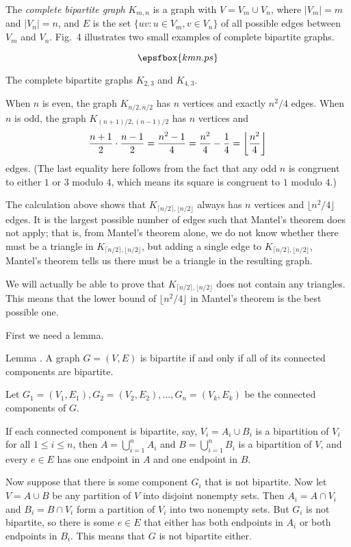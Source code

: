 The {\it complete bipartite graph} $K_{m,n}$ is a graph with $V = V_m \cup V_n$, where
$|V_m|=m$ and $|V_n| = n$, and $E$ is the set $\{uv : u\in V_m, v\in V_n\}$ of
all possible edges between $V_m$ and $V_n$. Fig.~4 illustrates two small examples
of complete bipartite graphs.

\midinsert
$$\epsfbox{kmn.ps}$$
\vskip5pt
\caption{The complete bipartite graphs $K_{2,3}$ and $K_{4,3}$.}
\endinsert
\goodbreak
When $n$ is even, the graph $K_{n/2,n/2}$ has $n$ vertices and exactly $n^2/4$ edges.
When $n$ is odd, the graph $K_{(n+1)/2, (n-1)/2}$ has $n$ vertices and
$$ {n+1\over 2} \cdot {n-1\over 2} = {n^2-1\over 4} = {n^2\over 4}-{1\over 4}
= \biggl\lfloor {n^2\over 4} \biggr\rfloor$$
edges. (The last equality here follows from the fact that any odd $n$ is congruent to either $1$ or
$3$ modulo $4$, which means its square is congruent to $1$ modulo $4$.)

The calculation above shows that $K_{\lceil n/2 \rceil, \lfloor n/2 \rfloor}$
always has $n$ vertices and $\lfloor n^2/4\rfloor$ edges. It is the largest possible number
of edges such that Mantel's theorem does not apply; that is, from Mantel's theorem alone,
we do not know whether
there must be a triangle in $K_{\lceil n/2 \rceil, \lfloor n/2 \rfloor}$, but adding
a single edge to $K_{\lceil n/2 \rceil, \lfloor n/2 \rfloor}$, Mantel's theorem tells
us there must be a triangle in the resulting graph.

We will actually be able to prove that $K_{\lceil n/2 \rceil, \lfloor n/2 \rfloor}$ does not
contain any triangles. This means that the lower bound of $\lfloor n^2/4\rfloor$ in Mantel's theorem
is the best possible one.

First we need a lemma.

\proclaim Lemma \advthm. A graph $G=(V,E)$ is bipartite if and only if all of its connected components
are bipartite.

\proof Let $G_1 = (V_1, E_1), G_2 = (V_2,E_2),\ldots, G_n = (V_k, E_k)$ be the
connected components of $G$.

If each connected component is bipartite, say,
$V_i = A_i\cup B_i$ is a bipartition of $V_i$ for all $1\le i\le n$, then
$A = \bigcup_{i=1}^n A_i$ and $B = \bigcup_{i=1}^n B_i$ is a bipartition of $V$,
and every $e\in E$ has one endpoint in $A$ and one endpoint in $B$.

Now suppose that there is some component $G_i$ that is not bipartite.
Now let $V = A\cup B$
be any partition of $V$ into disjoint nonempty sets. Then $A_i = A\cap V_i$
and $B_i = B\cap V_i$ form a partition of $V_i$
into two nonempty sets. But $G_i$ is not bipartite, so there is some $e\in E$
that either has both endpoints in $A_i$ or both endpoints in $B_i$. This means
that $G$ is not bipartite either.\slug

